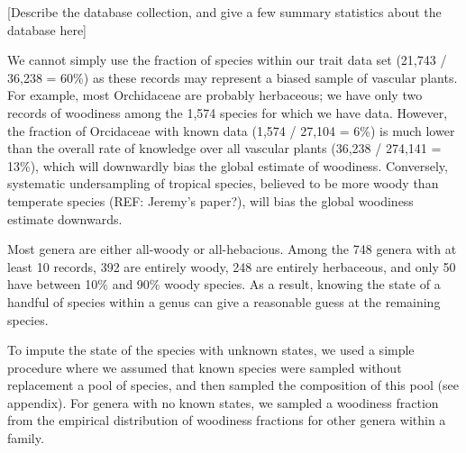 \documentclass[12pt]{article}
\begin{document}
[Describe the database collection, and give a few summary statistics
about the database here]

We cannot simply use the fraction of species within our trait
data set (21,743 / 36,238 = 60\%) as these records may represent a
biased sample of vascular plants.
For example, most Orchidaceae are probably herbaceous; we have only
two records of woodiness among the 1,574 species for which we have
data.
However, the fraction of Orcidaceae with known data (1,574 / 27,104 =
6\%)
is much lower than the overall rate of knowledge over all vascular
plants (36,238 / 274,141 = 13\%), which will downwardly bias the
global estimate of woodiness.
%
Conversely, systematic undersampling of tropical species, believed to
be more woody than temperate species (REF: Jeremy's paper?), will bias
the global woodiness estimate downwards.

Most genera are either all-woody or all-hebacious.  Among the 748
genera with at least 10 records, 392 are entirely woody, 248 are
entirely herbaceous, and only 50 have between 10\% and 90\% woody
species.  As a result, knowing the state of a handful of species
within a genus can give a reasonable guess at the remaining species.

To impute the state of the species with unknown states, we used a
simple procedure where we assumed that known species were sampled
without replacement a pool of species, and then sampled the
composition of this pool (see appendix).  For genera with no known
states, we sampled a woodiness fraction from the empirical
distribution of woodiness fractions for other genera within a family.
\end{document}
